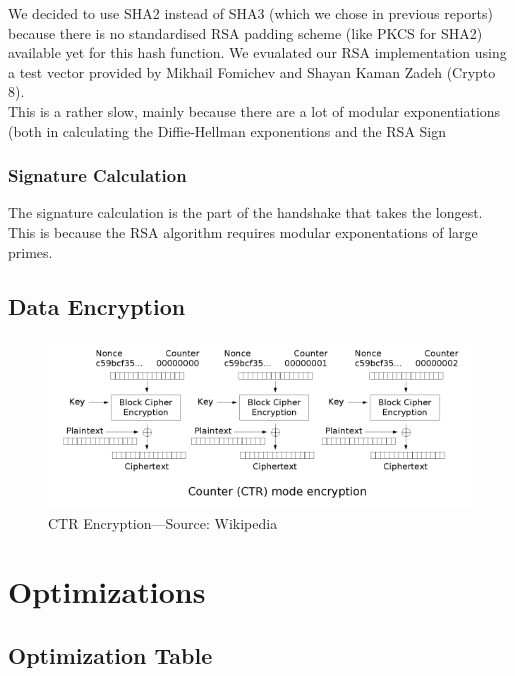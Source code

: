 \documentclass[a4paper]{article}
\begin{document}
We decided to use SHA2 instead of SHA3 (which we chose in previous reports) because there is no standardised RSA padding scheme (like PKCS for SHA2) available yet for this hash function. We evualated our RSA implementation using a test vector provided by Mikhail Fomichev and Shayan Kaman Zadeh (Crypto 8).\\

This is a rather slow, mainly because there are a lot of modular exponentiations (both in calculating the Diffie-Hellman exponentions and the RSA Sign

\subsubsection{Signature Calculation}

The signature calculation is the part of the handshake that takes the longest. This is because the RSA algorithm requires modular exponentations of large primes. 

\subsection{Data Encryption}

\begin{figure}[h]
    \centering
    \includegraphics[scale=0.75]{ctr_encryption.png}
    \caption{CTR Encryption---Source: Wikipedia}
    \label{fig:ctr_encryption}
\end{figure}

\section{Optimizations}

\subsection{Optimization Table}
\end{document}
